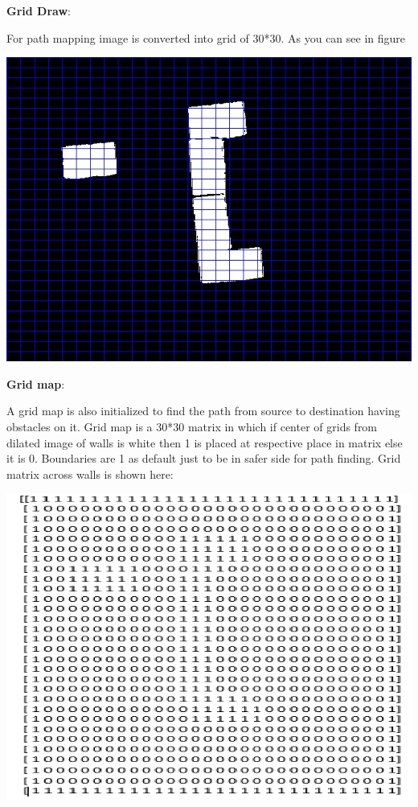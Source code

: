 \documentclass[report]{res}
\begin{document}
	\pagebreak	
	
	
	\textbf{Grid Draw}:
	
	For path mapping image is converted into grid of 30*30. As you can see in figure 
	
	\begin{center}
		\includegraphics[scale = 0.7]{graphics/case1/walls_mask11.jpg}\\
	\end{center}
	
	\pagebreak
	
	
	\textbf{Grid map}:
	
	A grid map is also initialized to find the path from source to destination having obstacles on it. Grid map is a 30*30 matrix in which if center of grids from dilated image of walls is white then 1 is placed at respective place in matrix else it is 0. Boundaries are 1 as default just to be in safer side for path finding. Grid matrix across walls is shown here:\\
	
	\begin{center}
		\includegraphics[scale = 0.8]{graphics/grid_map.png}\\
	\end{center}
	
\end{document}
